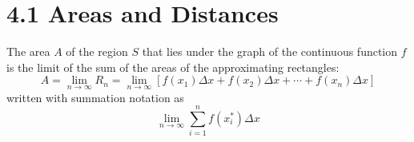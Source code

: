 %
%

\section*{4.1 Areas and Distances}

The area \(A\) of the region \(S\) that lies under the graph of the continuous function \(f\) is the limit of the sum of the areas of the approximating rectangles:
$$ A = \lim_{n \to \infty}R_n = \lim_{n \to \infty}[f(x_1) \Delta x + f(x_2) \Delta x + \cdots + f(x_n) \Delta x] $$
written with summation notation as 
$$ \lim_{n \to \infty}\sum_{i=1}^{n}f(x_i^*) \Delta x $$

